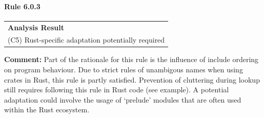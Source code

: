 \paragraph{Rule 6.0.3}
\begin{longtable}{p{13cm}}
\textbf{Analysis Result} \\
(C5) Rust-specific adaptation potentially required \\
\end{longtable}
\textbf{Comment:} Part of the rationale for this rule is the influence of include ordering on program behaviour. Due to strict rules of unambigous names when using crates in Rust, this rule is partly satisfied. Prevention of cluttering during lookup still requires following this rule in Rust code (see example). A potential adaptation could involve the usage of `prelude' modules that are often used within the Rust ecosystem. \\


